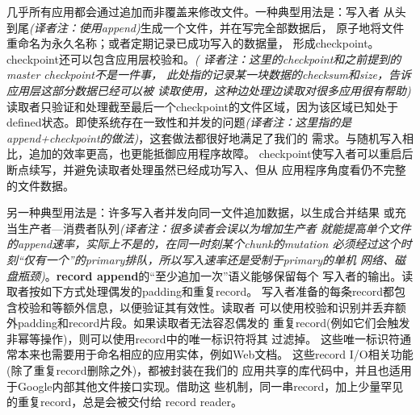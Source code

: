 几乎所有应用都会通过追加而非覆盖来修改文件。一种典型用法是：写入者
从头到尾\emph{(译者注：使用append)}生成一个文件，并在写完全部数据后，
原子地将文件重命名为永久名称；或者定期记录已成功写入的数据量，
形成checkpoint。checkpoint还可以包含应用层校验和。\emph{(
译者注：这里的checkpoint和之前提到的master checkpoint不是一件事，
此处指的记录某一块数据的checksum和size，告诉应用层这部分数据已经可以被
读取使用，这种边处理边读取对很多应用很有帮助)}
读取者只验证和处理截至最后一个checkpoint的文件区域，因为该区域已知处于
defined状态。即使系统存在一致性和并发的问题\emph{(译者注：这里指的是
append+checkpoint的做法)}，这套做法都很好地满足了我们的
需求。与随机写入相比，追加的效率更高，也更能抵御应用程序故障。
checkpoint使写入者可以重启后断点续写，并避免读取者处理虽然已经成功写入、但从
应用程序角度看仍不完整的文件数据。

另一种典型用法是：许多写入者并发向同一文件追加数据，以生成合并结果
或充当生产者—消费者队列\emph{(译者注：很多读者会误以为增加生产者
就能提高单个文件的append速率，实际上不是的，在同一时刻某个chunk的mutation
必须经过这个时刻“仅有一个”的primary排队，所以写入速率还是受制于primary的单机
网络、磁盘瓶颈)}。\textbf{record append}的“至少追加一次”语义能够保留每个
写入者的输出。读取者按如下方式处理偶发的padding和重复record。
写入者准备的每条record都包含校验和等额外信息，以便验证其有效性。读取者
可以使用校验和识别并丢弃额外padding和record片段。如果读取者无法容忍偶发的
重复record(例如它们会触发非幂等操作)，则可以使用record中的唯一标识符将其
过滤掉。
这些唯一标识符通常本来也需要用于命名相应的应用实体，例如Web文档。
这些record I/O相关功能(除了重复record删除之外)，都被封装在我们的
应用共享的库代码中，并且也适用于Google内部其他文件接口实现。借助这
些机制，同一串record，加上少量罕见的重复record，总是会被交付给
record reader。
